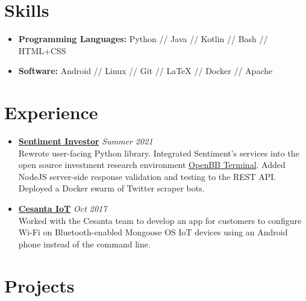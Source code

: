 \documentclass[11pt,twoside,a4paper]{book}
\newcommand{\cvdate}[1] {\hfill {\color{gray} \mdseries \slshape \normalsize #1}}
\begin{document}
\section*{Skills}

\begin{itemize}
  \itemsep0em
  \item \textbf{Programming Languages:} Python // Java // Kotlin // Bash // HTML+CSS
  \item \textbf{Software:} Android // Linux // Git // \LaTeX{} // Docker // Apache
\end{itemize}

\section*{Experience}

\begin{itemize}

  \item {\bfseries \large \href{https://sentimentinvestor.com/}{Sentiment Investor}} \cvdate{Summer 2021} \\
    Rewrote user-facing Python library. Integrated Sentiment's services into the open source investment research environment \href{https://openbb.co/}{OpenBB Terminal}. Added NodeJS server-side response validation and testing to the REST API. Deployed a Docker swarm of Twitter scraper bots.


\item {\bfseries \large \href{https://mongoose-os.com/}{Cesanta IoT}} \cvdate{Oct 2017} \\
Worked with the Cesanta team to develop an app for customers to configure Wi-Fi on Bluetooth-enabled Mongoose OS IoT devices using an Android phone instead of the command line.
\end{itemize}

\section*{Projects}
\end{document}
